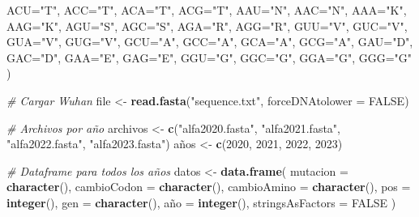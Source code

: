\documentclass[
]{article}
\newenvironment{Shaded}{\begin{snugshade}}{\end{snugshade}}
\newcommand{\AttributeTok}[1]{\textcolor[rgb]{0.13,0.29,0.53}{#1}}
\newcommand{\CommentTok}[1]{\textcolor[rgb]{0.56,0.35,0.01}{\textit{#1}}}
\newcommand{\ConstantTok}[1]{\textcolor[rgb]{0.56,0.35,0.01}{#1}}
\newcommand{\DecValTok}[1]{\textcolor[rgb]{0.00,0.00,0.81}{#1}}
\newcommand{\FunctionTok}[1]{\textcolor[rgb]{0.13,0.29,0.53}{\textbf{#1}}}
\newcommand{\NormalTok}[1]{#1}
\newcommand{\OtherTok}[1]{\textcolor[rgb]{0.56,0.35,0.01}{#1}}
\newcommand{\StringTok}[1]{\textcolor[rgb]{0.31,0.60,0.02}{#1}}
\begin{document}
\begin{Shaded}
\begin{Highlighting}[]
  \AttributeTok{ACU=}\StringTok{"T"}\NormalTok{, }\AttributeTok{ACC=}\StringTok{"T"}\NormalTok{, }\AttributeTok{ACA=}\StringTok{"T"}\NormalTok{, }\AttributeTok{ACG=}\StringTok{"T"}\NormalTok{,}
  \AttributeTok{AAU=}\StringTok{"N"}\NormalTok{, }\AttributeTok{AAC=}\StringTok{"N"}\NormalTok{, }\AttributeTok{AAA=}\StringTok{"K"}\NormalTok{, }\AttributeTok{AAG=}\StringTok{"K"}\NormalTok{,}
  \AttributeTok{AGU=}\StringTok{"S"}\NormalTok{, }\AttributeTok{AGC=}\StringTok{"S"}\NormalTok{, }\AttributeTok{AGA=}\StringTok{"R"}\NormalTok{, }\AttributeTok{AGG=}\StringTok{"R"}\NormalTok{,}
  \AttributeTok{GUU=}\StringTok{"V"}\NormalTok{, }\AttributeTok{GUC=}\StringTok{"V"}\NormalTok{, }\AttributeTok{GUA=}\StringTok{"V"}\NormalTok{, }\AttributeTok{GUG=}\StringTok{"V"}\NormalTok{,}
  \AttributeTok{GCU=}\StringTok{"A"}\NormalTok{, }\AttributeTok{GCC=}\StringTok{"A"}\NormalTok{, }\AttributeTok{GCA=}\StringTok{"A"}\NormalTok{, }\AttributeTok{GCG=}\StringTok{"A"}\NormalTok{,}
  \AttributeTok{GAU=}\StringTok{"D"}\NormalTok{, }\AttributeTok{GAC=}\StringTok{"D"}\NormalTok{, }\AttributeTok{GAA=}\StringTok{"E"}\NormalTok{, }\AttributeTok{GAG=}\StringTok{"E"}\NormalTok{,}
  \AttributeTok{GGU=}\StringTok{"G"}\NormalTok{, }\AttributeTok{GGC=}\StringTok{"G"}\NormalTok{, }\AttributeTok{GGA=}\StringTok{"G"}\NormalTok{, }\AttributeTok{GGG=}\StringTok{"G"}
\NormalTok{)}

\CommentTok{\# Cargar Wuhan}
\NormalTok{file }\OtherTok{\textless{}{-}} \FunctionTok{read.fasta}\NormalTok{(}\StringTok{"sequence.txt"}\NormalTok{, }\AttributeTok{forceDNAtolower =} \ConstantTok{FALSE}\NormalTok{)}

\CommentTok{\# Archivos por año}
\NormalTok{archivos }\OtherTok{\textless{}{-}} \FunctionTok{c}\NormalTok{(}\StringTok{"alfa2020.fasta"}\NormalTok{, }\StringTok{"alfa2021.fasta"}\NormalTok{, }\StringTok{"alfa2022.fasta"}\NormalTok{, }\StringTok{"alfa2023.fasta"}\NormalTok{)}
\NormalTok{años }\OtherTok{\textless{}{-}} \FunctionTok{c}\NormalTok{(}\DecValTok{2020}\NormalTok{, }\DecValTok{2021}\NormalTok{, }\DecValTok{2022}\NormalTok{, }\DecValTok{2023}\NormalTok{)}

\CommentTok{\# Dataframe para todos los años}
\NormalTok{datos }\OtherTok{\textless{}{-}} \FunctionTok{data.frame}\NormalTok{(}
  \AttributeTok{mutacion =} \FunctionTok{character}\NormalTok{(),}
  \AttributeTok{cambioCodon =} \FunctionTok{character}\NormalTok{(),}
  \AttributeTok{cambioAmino =} \FunctionTok{character}\NormalTok{(),}
  \AttributeTok{pos =} \FunctionTok{integer}\NormalTok{(),}
  \AttributeTok{gen =} \FunctionTok{character}\NormalTok{(),}
\NormalTok{  año }\OtherTok{=} \FunctionTok{integer}\NormalTok{(),}
  \AttributeTok{stringsAsFactors =} \ConstantTok{FALSE}
\NormalTok{)}


\end{Highlighting}
\end{Shaded}
\end{document}
